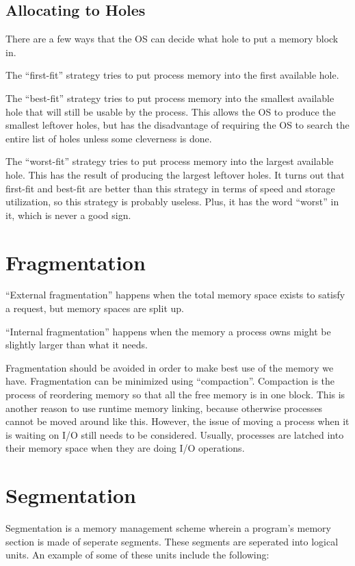 \documentclass{article}
\begin{document}
\subsection{Allocating to Holes}
There are a few ways that the OS can decide what hole to put a memory block in.

The ``first-fit'' strategy tries to put process memory into the first available
hole.

The ``best-fit'' strategy tries to put process memory into the smallest
available hole that will still be usable by the process. This allows the OS to
produce the smallest leftover holes, but has the disadvantage of requiring the
OS to search the entire list of holes unless some cleverness is done.

The ``worst-fit'' strategy tries to put process memory into the largest
available hole. This has the result of producing the largest leftover holes.
It turns out that first-fit and best-fit are better than this strategy in terms
of speed and storage utilization, so this strategy is probably useless. Plus,
it has the word ``worst'' in it, which is never a good sign.

\section{Fragmentation}
``External fragmentation'' happens when the total memory space exists to
satisfy a request, but memory spaces are split up.

``Internal fragmentation'' happens when the memory a process owns might be
slightly larger than what it needs.

Fragmentation should be avoided in order to make best use of the memory we
have. Fragmentation can be minimized using ``compaction''. Compaction is the
process of reordering memory so that all the free memory is in one block. This
is another reason to use runtime memory linking, because otherwise processes
cannot be moved around like this. However, the issue of moving a process when
it is waiting on I/O still needs to be considered. Usually, processes are
latched into their memory space when they are doing I/O operations.

\section{Segmentation}
Segmentation is a memory management scheme wherein a program's memory section
is made of seperate segments. These segments are seperated into logical units.
An example of some of these units include the following:
\end{document}
